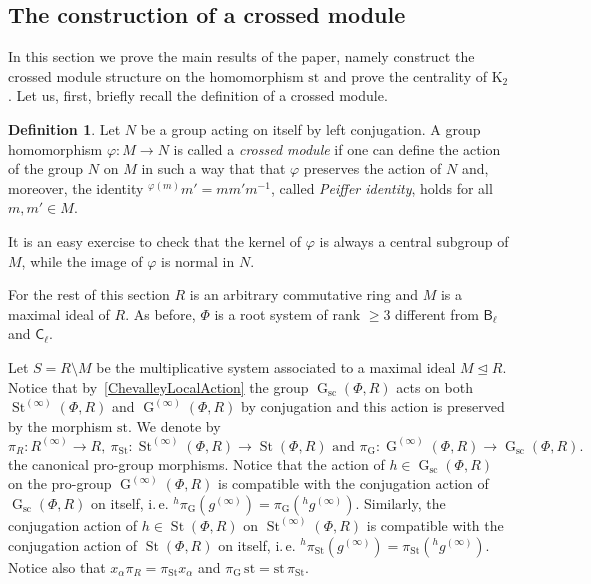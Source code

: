 \documentclass[oneside, 11pt]{amsart}
\numberwithin{equation}{section}
\theoremstyle{definition}
\newtheorem{df}[lemma]{Definition} \Crefname{df}{Definition}{Definitions}
\theoremstyle{remark}
\DeclareMathOperator\St{St}
\DeclareMathOperator\GG{G}
\newcommand{\up}[2]{{^{#1}\!{#2}}}
\newcommand{\rB}{\mathsf{B}}
\newcommand{\rC}{\mathsf{C}}
\begin{document}
\subsection{The construction of a crossed module}
In this section we prove the main results of the paper, namely construct the crossed module structure on the homomorphism $\mathrm{st}$ and prove the centrality of $\mathrm{K}_2$. Let us, first, briefly recall the definition of a crossed module. 

\begin{df} \label{df:crossed-module}
Let $N$ be a group acting on itself by left conjugation.
A group homomorphism $\varphi\colon M \to N$ is called a {\it crossed module} if one can define the action of the group $N$ on $M$ in such a way that that $\varphi$ preserves the action of $N$ and, moreover, the identity ${}^{\varphi(m)}\!m' = m m' m^{-1}$, called {\it Peiffer identity}, holds for all $m, m' \in M$.
\end{df}
It is an easy exercise to check that the kernel of $\varphi$ is always a central subgroup of $M$, while the image of $\varphi$ is normal in $N$.

For the rest of this section $R$ is an arbitrary commutative ring and $M$ is a maximal ideal of $R$.
As before, \(\Phi\) is a root system of rank \(\geq 3\) different from \(\rB_\ell\) and \(\rC_\ell\).

Let $S = R\setminus M$ be the multiplicative system associated to a maximal ideal $M \trianglelefteq R$.
Notice that by~\cref{ChevalleyLocalAction} the group $\GG_{\mathrm{sc}}(\Phi, R)$ acts on both $\St^{(\infty)}(\Phi, R)$ and $\GG^{(\infty)}(\Phi, R)$ by conjugation and this action is preserved by the morphism $\mathrm{st}$.
We denote by \[\pi_R \colon R^{(\infty)} \to R,\ \pi_{\St} \colon \St^{(\infty)}(\Phi, R) \to \St(\Phi, R)\text{ and } \pi_{\GG} \colon \GG^{(\infty)}(\Phi, R) \to \GG_{\mathrm{sc}}(\Phi, R).\] the canonical pro-group morphisms. Notice that the action of $h\in \GG_{\mathrm{sc}}(\Phi, R)$ on the pro-group $\GG^{(\infty)}(\Phi, R)$ is compatible with the conjugation action of $\GG_{\mathrm{sc}}(\Phi, R)$ on itself, i.\,e. $\up{h}\pi_{\GG}(g^{(\infty)}) = \pi_{\GG}(\up{h} {g^{(\infty)}})$.
Similarly, the conjugation action of $h\in \St(\Phi, R)$ on $\St^{(\infty)}(\Phi, R)$ is compatible with the conjugation action of $\St(\Phi, R)$ on itself, i.\,e. $\up{h}\pi_{\St}(g^{(\infty)}) = \pi_{\St}(\up{h}{g^{(\infty)}})$.
Notice also that $x_\alpha \pi_R = \pi_{\St} x_\alpha$ and $\pi_{\GG}\, \mathrm{st} = \mathrm{st}\, \pi_{\St}$.
\end{document}
